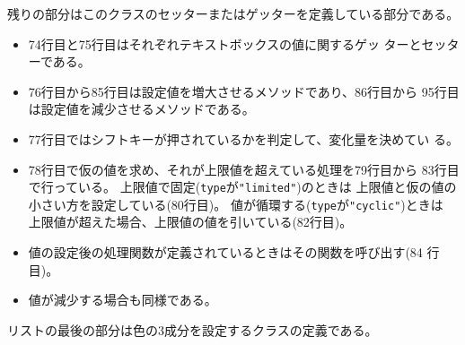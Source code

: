 残りの部分はこのクラスのセッターまたはゲッターを定義している部分である。
\begin{itemize}
 \item 74行目と75行目はそれぞれテキストボックスの値に関するゲッ
       ターとセッターである。
 \item 76行目から85行目は設定値を増大させるメソッドであり、86行目から
       95行目は設定値を減少させるメソッドである。
 \item 77行目ではシフトキーが押されているかを判定して、変化量を決めてい
       る。
 \item 78行目で仮の値を求め、それが上限値を超えている処理を79行目から
			 83行目で行っている。
			 上限値で固定(\texttt{type}が\texttt{"limited"})のときは
       上限値と仮の値の小さい方を設定している(80行目)。
			値が循環する(\texttt{type}が\texttt{"cyclic"})ときは
       上限値が超えた場合、上限値の値を引いている(82行目)。
 \item 値の設定後の処理関数が定義されているときはその関数を呼び出す(84
       行目)。
 \item 値が減少する場合も同様である。
\end{itemize}
リストの最後の部分は色の3成分を設定するクラスの定義である。
